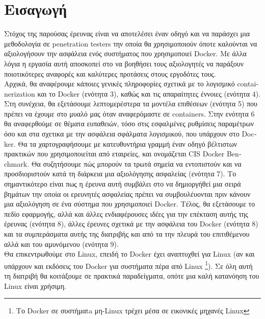\section{Εισαγωγή}
\label{introduction}


Στόχος της παρούσας έρευνας είναι να αποτελέσει έναν οδηγό και να παράσχει
μια μεθοδολογία σε \textlatin{penetration testers} την οποία θα χρησιμοποιούν
όποτε καλούνται να αξιολογήσουν την ασφάλεια ενός συστήματος που χρησιμοποιεί
\textlatin{Docker}. Με άλλα λόγια η εργασία αυτή αποσκοπεί στο να βοηθήσει τους
αξιολογητές να παράξουν ποιοτικότερες αναφορές και καλύτερες προτάσεις στους
εργοδότες τους.\mbox{} \\

Αρχικά, θα αναφέρουμε κάποιες γενικές
πληροφορίες σχετικά με το λογισμικό \textlatin{containerization} και το
\textlatin{Docker} (ενότητα 3), καθώς και τις απαραίτητες έννοιες (ενότητα 4).
Στη συνέχεια, θα εξετάσουμε λεπτομερέστερα
τα μοντέλα επιθέσεων (ενότητα 5) που πρέπει να έχουμε στο μυαλό μας όταν
αναφερόμαστε σε \textlatin{containers}.
Στην ενότητα 6 θα αναφερθούμε σε θέματα ευπαθειών, τόσο στις εσφαλμένες
ρυθμίσεις παραμέτρων όσο και στα σχετικα με την ασφάλεια
σφάλματα λογισμικού, που υπάρχουν στο \textlatin{Docker}. Θα τα χαρτογραφήσουμε
με κατευθυντήρια γραμμή έναν οδηγό βέλτιστων πρακτικών που
χρησιμοποιείται από εταιρείες, και ονομάζεται
\textlatin{CIS Docker Benchmark}. 
Θα συζητήσουμε πώς μπορούν τα τρωτά σημεία να εντοπιστούν και να προσδιοριστούν
κατά τη διάρκεια μια αξιολόγησης ασφαλείας (ενότητα 7). Το σημαντικότερο είναι
πως η έρευνα αυτή συμβάλει στο να δημιοργήθεί μια σειρά βημάτων την οποία οι
ερευνητές ασφαλείας πρέπει να συμβουλέυονται πριν κάνουν μια αξιολόγηση σε ένα
σύστημα που χρησιμοποιεί \textlatin{Docker}. Τέλος, θα εξετάσουμε το πεδίο
εφαρμογής, αλλά και άλλες ενδιαφέρουσες ιδέες για την επέκταση αυτής της
έρευνας (ενότητα 8), άλλες έρευνες σχετικά με την ασφάλεια του
\textlatin{Docker} (ενότητα 8) και τα συμπεράσματα αυτής της διατριβής και από
τα την πλευρά του επιτιθέμενου αλλά και του αμυνόμενου  (ενότητα 9).\mbox{} \\

Θα επικεντρωθούμε στο \textlatin{Linux}, επειδή το \textlatin{Docker} έχει αναπτυχθεί για
\textlatin{Linux} (αν και υπάρχουν και εκδόσεις του \textlatin{Docker} για συστήματα πέρα από \textlatin{Linux} \footnote{Το \textlatin{Docker} σε συστήμαta μη-\textlatin{Linux} τρέχει μέσα σε εικονικές μηχανές \textlatin{Linux}}).
Σε όλη αυτή τη διατριβή θα κοιτάξουμε σε πρακτικά παραδείγματα, οπότε μια καλή
κατανόηση του \textlatin{Linux} είναι χρήσιμη.
